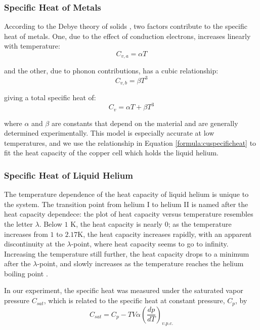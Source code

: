 \subsubsection{Specific Heat of Metals}\label{specificheatofmetals}

According to the Debye theory of solids \cite{schroeder}, two factors
contribute to the specific heat of metals. One, due to the effect of
conduction electrons, increases linearly with temperature:
\begin{equation}
C_{v,a} = \alpha T
\end{equation}

and the other, due to phonon contributions, has a cubic relationship:
\begin{equation}
C_{v,b} = \beta T^3
\end{equation}

giving a total specific heat of:
\begin{equation}\label{formula:cuspecificheat}
C_v=  \alpha T + \beta T^3
\end{equation}

where $\alpha$ and $\beta$ are constants that depend on the material
and are generally determined experimentally. This model is especially accurate
at low temperatures, and we use the relationship in Equation
\ref{formula:cuspecificheat} to fit the heat capacity of the copper
cell which holds the liquid helium.

\subsubsection{Specific Heat of Liquid Helium}\label{specificheatofliquidhelium}

The temperature dependence of the heat capacity of liquid helium is
unique to the system. The transition point from helium I to helium II
is named after the heat capacity dependece: the plot of heat capacity
versus temperature resembles the letter $\lambda$. Below $1$ K, the
heat capacity is nearly $0$; as the temperature increases from $1$ to
$2.17$K, the heat capacity increases rapidly, with an apparent
discontinuity at the $\lambda$-point, where heat capacity seems
to go to infinity. Increasing the temperature still further, the
heat capacity drops to a minimum after the $\lambda$-point, and slowly
increases as the temperature reaches the helium boiling point \cite{atkins}.

In our experiment, the specific heat was measured under the saturated
vapor pressure $C_{sat}$, which is related to the specific heat at constant pressure, $C_p$, by
\begin{equation}\label{formula:cuspecificheat}
C_{sat} = C_p - TV\alpha\left(\dfrac{dp}{dT}\right)_{v.p.c.} 
\end{equation}

